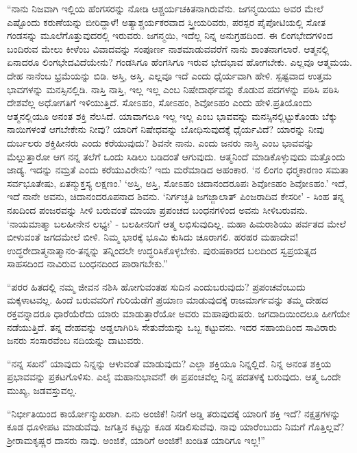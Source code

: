  “ನಾನು ನಿಜವಾಗಿ ಇಲ್ಲಿಯ ಹೆಂಗಸರನ್ನು ನೋಡಿ ಆಶ್ಚರ್ಯಚಕಿತನಾಗಿರುವೆನು. ಜಗನ್ಮಯಿಯು ಅವರ ಮೇಲೆ ಎಷ್ಟೊಂದು ಕರುಣೆಯನ್ನು ಬೀರಿದ್ದಾಳೆ! ಅತ್ಯಾಶ್ಚರ್ಯಕರವಾದ ಸ್ತ್ರೀಯರಿವರು, ಪರಸ್ಪರ ಪೈಪೋಟಿಯಲ್ಲಿ ಸೋತ ಗಂಡಸನ್ನು ಮೂಲೆಗೊತ್ತುವುದರಲ್ಲಿ ಇರುವರು. ಜಗನ್ಮಯಿ, ಇದೆಲ್ಲ ನಿನ್ನ ಅನುಗ್ರಹದಿಂದ. ಈ ಲಿಂಗಭೇದಗಳಿಂದ ಬಂದಿರುವ ಮೇಲು ಕೀಳೆಂಬ ವಿವಾದವನ್ನು ಸಂಪೂರ್ಣ ನಾಶಮಾಡುವವರೆಗೆ ನಾನು ಶಾಂತನಾಗಲಾರೆ. ಆತ್ಮನಲ್ಲಿ ಏನಾದರೂ‌ ಲಿಂಗಭೇದವಿದೆಯೇನು? ಗಂಡಸಿಗೂ ಹೆಂಗಸಿಗೂ ಇರುವ ಭೇದಭಾವ ಹೋಗಬೇಕು. ಎಲ್ಲವೂ ಆತ್ಮಮಯ. ದೇಹ ನಾನೆಂಬ ಭ್ರಮೆಯನ್ನು ಬಿಡಿ. ಅಸ್ತಿ, ಅಸ್ತಿ. ಎಲ್ಲವೂ ಇದೆ ಎಂದು ಧೈರ್ಯವಾಗಿ ಹೇಳಿ. ಸ್ಪಷ್ಟವಾದ ಉತ್ತಮ ಭಾವಗಳನ್ನು ಮನಸ್ಸಿನಲ್ಲಿಡಿ. ನಾಸ್ತಿ ನಾಸ್ತಿ, ಇಲ್ಲ ಇಲ್ಲ ಎಂಬ ನಿಷೇದಾರ್ಥವನ್ನು ಕೊಡುವ ಪದಗಳನ್ನು ಪಠಿಸಿ ಪಠಿಸಿ ದೇಶವೆಲ್ಲ ಅಧೋಗತಿಗೆ ಇಳಿಯುತ್ತಿದೆ. ಸೋಽಹಂ, ಸೋಽಹಂ, ಶಿವೋಽಹಂ ಎಂದು ಹೇಳಿ.\break ಪ್ರತಿಯೊಂದು ಆತ್ಮನಲ್ಲಿಯೂ ಅನಂತ ಶಕ್ತಿ ನೆಲಸಿದೆ. ಯಾವಾಗಲೂ ಇಲ್ಲ ಇಲ್ಲ ಎಂಬ ಭಾವವನ್ನು ಮನಸ್ಸಿನಲ್ಲಿಟ್ಟುಕೊಂಡು ಬೆಕ್ಕು ನಾಯಿಗಳಂತೆ ಆಗಬೇಕೇನು ನೀವು? ಯಾರಿಗೆ ನಿಷೇಧವನ್ನು ಬೋಧಿಸುವುದಕ್ಕೆ ಧೈರ್ಯವಿದೆ? ಯಾರನ್ನು ನೀವು ದುರ್ಬಲರು ಶಕ್ತಿಹೀನರು ಎಂದು ಕರೆಯುವುದು? ಶಿವನೇ ನಾನು. ಎಂದು ಜನರು ನಾಸ್ತಿ ಎಂಬ ಭಾವವನ್ನು ಮೆಲ್ಲುತ್ತಾರೋ ಆಗ ನನ್ನ ತಲೆಗೆ ಒಂದು ಸಿಡಿಲು ಬಡಿದಂತೆ ಆಗುವುದು. ಆತ್ಮನಿಂದೆ ಮಾಡಿಕೊಳ್ಳುವುದು ಮತ್ತೊಂದು ಜಾಡ್ಯ. ಇದನ್ನು ನಮ್ರತೆ ಎಂದು ಕರೆಯುವಿರೇನು? ಇದು ಮರೆಮಾಡಿದ ಅಹಂಕಾರ. ‘ನ ಲಿಂಗಂ ಧರ‍್ಮಕಾರಣಂ ಸಮತಾ ಸರ್ವಭೂತೇಷು, ಏತನ್ಮುಕ್ತಸ್ಯ ಲಕ್ಷಣಂ.’ ‘ಅಸ್ತಿ, ಅಸ್ತಿ, ಸೋಽಹಂ ಚಿದಾನಂದರೂಪಃ ಶಿವೋಽಹಂ ಶಿವೋಽಹಂ.’ ಇದೆ, ಇದೆ ನಾನೇ ಅವನು, ಚಿದಾನಂದರೂಪನಾದ ಶಿವನು. ‘ನಿರ್ಗಚ್ಛತಿ ಜಗಜ್ಜಾಲಾತ್ ಪಿಂಜರಾದಿವ ಕೇಸರೀ' - ಸಿಂಹ ತನ್ನ ನಖದಿಂದ ಪಂಜರವನ್ನು ಸೀಳಿ ಬರುವಂತೆ ಮಾಯಾ ಪ್ರಪಂಚದ ಬಂಧನಗಳಿಂದ ಅವನು ಸೀಳಿಬರುವನು. ‘ನಾಯಮಾತ್ಮಾ ಬಲಹೀನೇನ ಲಭ್ಯಃ’ - ಬಲಹೀನರಿಗೆ ಆತ್ಮ ಲಭಿಸುವುದಿಲ್ಲ. ಮಹಾ ಹಿಮರಾಶಿಯು ಪರ್ವತದ ಮೇಲೆ ಬೀಳುವಂತೆ ಜಗದಮೇಲೆ ಬೀಳಿ. ನಿಮ್ಮ ಭಾರಕ್ಕೆ ಭೂಮಿ ಕುಸಿದು ಚೂರಾಗಲಿ. ಹರಹರ ಮಹಾದೇವ! ಉದ್ಧರೇದಾತ್ಮನಾತ್ಮಾನಂ-ತನ್ನನ್ನು ತನ್ನಿಂದಲೇ ಉದ್ಧರಿಸಿಕೊಳ್ಳಬೇಕು. ಪುರುಷಕಾರದ ಬಲದಿಂದ ಸ್ವಪ್ರಯತ್ನದ ಸಾಹಸದಿಂದ ನಾವಿರುವ ಬಂಧನದಿಂದ ಪಾರಾಗಬೇಕು.” 

 “ಪರರ ಹಿತದಲ್ಲಿ ನಮ್ಮ ಜೀವನ ನಶಿಸಿ ಹೋಗುವಂತಹ ಸುದಿನ ಎಂದು\break ಬರುವುದು? ಪ್ರಪಂಚವೆಂಬುದು ಮಕ್ಕಳಾಟವಲ್ಲ. ಹಿಂದೆ ಬರುವವರಿಗೆ ಗುರಿಯೆಡೆಗೆ ಪ್ರಯಾಣ ಮಾಡುವುದಕ್ಕೆ ರಾಜಮಾರ್ಗವನ್ನು ತಮ್ಮ ದೇಹದ ರಕ್ತವನ್ನಾದರೂ ಧಾರೆಯೆರೆದು ಯಾರು ಮಾಡುತ್ತಾರೆಯೋ ಅವರು ಮಹಾಪುರುಷರು. ಜಗದಾದಿಯಿಂದಲೂ ಹೀಗೆಯೇ ನಡೆಯುತ್ತಿದೆ. ತನ್ನ ದೇಹವನ್ನು ಅಡ್ಡಲಾಗಿರಿಸಿ ಸೇತುವೆಯನ್ನು ಒಬ್ಬ ಕಟ್ಟುವನು. ಇದರ ಸಹಾಯದಿಂದ ಸಾವಿರಾರು ಜನರು ಸಂಸಾರವೆಂಬ ನದಿಯನ್ನು ದಾಟುವರು.

 “ನನ್ನ ಸಖನೆ’ ಯಾವುದು ನಿನ್ನನ್ನು ಆಳುವಂತೆ ಮಾಡುವುದು? ಎಲ್ಲಾ ಶಕ್ತಿಯೂ ನಿನ್ನಲ್ಲಿದೆ. ನಿನ್ನ ಅನಂತ ಶಕ್ತಿಯ ಪ್ರಭಾವವನ್ನು ಪ್ರಕಟಗೊಳಿಸು. ಎಲೈ ಮಹಾನುಭಾವನೆ! ಈ ಪ್ರಪಂಚವೆಲ್ಲ ನಿನ್ನ ಪದತಳಕ್ಕೆ ಬರುವುದು. ಆತ್ಮ ಒಂದೇ ಮುಖ್ಯ, ಜಡವಸ್ತುವಲ್ಲ.

 “ನಿರ್ಭೀತಿಯಿಂದ ಕಾರ್ಯೋನ್ಮುಖರಾಗಿ. ಏನು ಅಂಜಿಕೆ! ನಿನಗೆ ಅಡ್ಡಿ ತರುವುದಕ್ಕೆ ಯಾರಿಗೆ ಶಕ್ತಿ ಇದೆ? ನಕ್ಷತ್ರಗಳನ್ನು ಕೂಡ ಧೂಳೀಪಟ ಮಾಡುವೆವು. ಜಗತ್ತಿನ ಕಟ್ಟನ್ನು ಕೂಡ ಸಡಿಲಿಸುವೆವು. ನಾವು ಯಾರೆಂಬುದು ನಿಮಗೆ ಗೊತ್ತಿಲ್ಲವೆ? ಶ‍್ರೀರಾಮಕೃಷ್ಣರ ದಾಸರು ನಾವು. ಅಂಜಿಕೆ, ಯಾರಿಗೆ ಅಂಜಿಕೆ! ಖಂಡಿತ ಯಾರಿಗೂ ಇಲ್ಲ!” 

